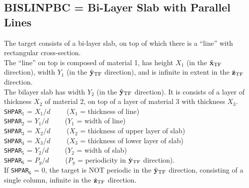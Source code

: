 \subsection{ BISLINPBC = Bi-Layer Slab with Parallel Lines}
        \label{sec:BISLINPBC}
        The target consists of a bi-layer slab, on top of which there is
        a ``line'' with rectangular cross-section.\\
	The ``line'' on top
	is composed of material 1, has height $X_1$ (in the $\hat{\bf x}_{\rm TF}$ direction),
	width $Y_1$ (in the $\hat{\bf y}_{\rm TF}$ direction), and
	is infinite in extent in the $\hat{\bf z}_{\rm TF}$ direction.\\
	The bilayer slab has width $Y_2$ (in the $\hat{\bf y}_{\rm TF}$ direction).
	It is consists of a layer of thickness $X_2$ of material 2, on top
	of a layer of material 3 with thickness $X_3$.\\
	{\tt SHPAR}$_1$ = $X_1/d$~~~~ ($X_1$ = thickness of line)\\
	{\tt SHPAR}$_2$ = $Y_1/d$~~~~ ($Y_1$ = width of line)\\
	{\tt SHPAR}$_3$ = $X_2/d$~~~~ ($X_2$ = thickness of upper layer of 
	slab)\\
	{\tt SHPAR}$_4$ = $X_3/d$~~~~ ($X_3$ = thickness of lower layer of 
	slab)\\
	{\tt SHPAR}$_5$ = $Y_2/d$~~~~ ($Y_2$ = width of slab)\\
	{\tt SHPAR}$_6$ = $P_y/d$~~~~ ($P_y$ = periodicity in $\hat{\bf y}_{\rm TF}$ 
        direction).\\

	If {\tt SHPAR}$_6$ = 0, the target is NOT periodic in the $\hat{\bf y}_{\rm TF}$
	direction, consisting of a single column, infinite in the $\hat{\bf z}_{\rm TF}$
	direction.
